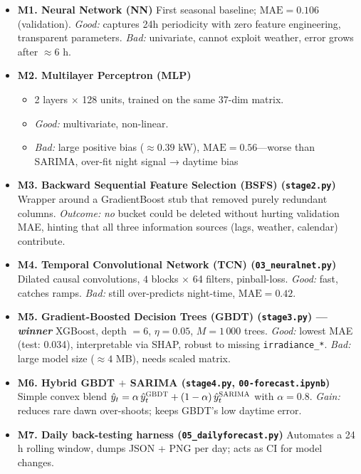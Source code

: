 \begin{itemize}

    \item \textbf{M1. Neural Network (NN)} 
      First seasonal baseline; $\mathrm{MAE}=0.106$ (validation).  
      \emph{Good:} captures 24h periodicity with zero feature
      engineering, transparent parameters.  
      \emph{Bad:} univariate, cannot exploit weather, error grows after
      $\approx6$ h.

    \item \textbf{M2. Multilayer Perceptron (MLP)}  
      \begin{itemize}
        \item 2 layers $\times$ 128 units, trained on the same 37-dim matrix.  
        \item \emph{Good:} multivariate, non-linear.  
        \item \emph{Bad:} large positive bias ($\approx0.39$ kW),
        $\mathrm{MAE}=0.56$—worse than SARIMA, over-fit night signal → daytime bias
      \end{itemize}


    \item \textbf{M3. Backward Sequential Feature Selection (BSFS) (\texttt{stage2.py})}
      Wrapper around a GradientBoost stub that removed purely redundant
      columns.  \emph{Outcome:} \emph{no} bucket could be deleted without
      hurting validation MAE, hinting that all three information sources
      (lags, weather, calendar) contribute.

    \item \textbf{M4. Temporal Convolutional Network (TCN) (\texttt{03\_neuralnet.py})} 
      Dilated causal convolutions, $4$ blocks $\times$ 64 filters,
      pinball-loss.  \emph{Good:} fast, catches ramps.  
      \emph{Bad:} still over-predicts night-time, $\mathrm{MAE}=0.42$.

    \item \textbf{M5. Gradient-Boosted Decision Trees (GBDT) (\texttt{stage3.py}) --- \emph{winner}}  
      XGBoost, depth $=6$, $\eta=0.05$, $M=1\,000$ trees.  
      \emph{Good:} lowest MAE (test: 0.034), interpretable via SHAP,
      robust to missing \texttt{irradiance\_*}.
      \emph{Bad:} large model size ($\approx4$ MB), needs scaled matrix.

    \item \textbf{M6. Hybrid GBDT $+$ SARIMA (\texttt{stage4.py}, \texttt{00-forecast.ipynb})}  
      Simple convex blend
      $\hat y_t = \alpha\,\hat y^{\textsc{GBDT}}_t
                 +(1-\alpha)\,\hat y^{\textsc{SARIMA}}_t$ with
      $\alpha=0.8$.  \emph{Gain:} reduces rare dawn over-shoots; keeps
      GBDT’s low daytime error.

    \item \textbf{M7. Daily back-testing harness (\texttt{05\_dailyforecast.py})}  
      Automates a 24 h rolling window, dumps JSON + PNG per day; acts as
      CI for model changes.

\end{itemize}

